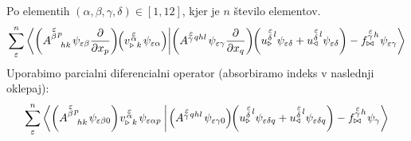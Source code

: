 Po elementih $(\alpha, \beta, \gamma, \delta) \in [1,12]$, kjer je $n$ število elementov.
\begin{equation}
   \sum^n_{\varepsilon}
   \braket{
      \left(A^{\substack{\mkern2mu \varepsilon \\[0.15mm] \beta} \mkern2mu p}_{\mkern19mu hk} \mkern2mu \psi_{ \varepsilon \beta} \frac{\partial}{\partial x_p}\right) \mkern-5mu
      \left(v^{\mkern 2mu \substack{\varepsilon \\[-0.5mm] \alpha \\[-0.2mm]}}_{\triangleright \mkern5mu k} \mkern2mu \psi_{\varepsilon \alpha}\right)}
   {
      \left(A^{\substack{\mkern2mu \varepsilon \\[-0.4mm] \gamma} \mkern2mu qhl} \mkern2mu \psi_{\varepsilon \gamma} \frac{\partial}{\partial x_q}\right) \mkern-5mu
      \left(u^{\substack{\mkern2mu \varepsilon \\[0.2mm] \delta} \mkern2mu l}_\triangleright \psi_{\varepsilon \delta} + u^{\substack{\mkern2mu \varepsilon \\[0.2mm] \delta} \mkern2mu l}_\triangleleft \psi_{\varepsilon \delta} \right)
      -
      f^{\substack{\mkern2mu \varepsilon \\[-0.4mm] \gamma} \mkern2mu h}_{\bowtie} \mkern1mu \psi_{\varepsilon \gamma}}
\end{equation}
Uporabimo parcialni diferencialni operator (absorbiramo indeks v naslednji oklepaj):
\begin{equation*}
   \sum^n_\varepsilon
   \braket{
      \left( A^{\substack{\mkern2mu \varepsilon \\[0.15mm] \beta} \mkern2mu p}_{\mkern19mu hk} \mkern2mu \psi_{ \varepsilon \beta 0} \right) \mkern-2mu
      v^{\mkern 2mu \substack{\varepsilon \\[-0.5mm] \alpha \\[-0.2mm]}}_{\triangleright \mkern5mu k} \mkern2mu \psi_{\varepsilon \alpha p} \mkern4mu}
   {
      \mkern2mu \left( A^{\substack{\mkern2mu \varepsilon \\[-0.4mm] \gamma} \mkern2mu qhl} \mkern2mu \psi_{\varepsilon \gamma 0} \right) \mkern-5mu 
      \left( u^{\substack{\mkern2mu \varepsilon \\[0.2mm] \delta} \mkern2mu l}_\triangleright \psi_{\varepsilon \delta q} + u^{\substack{\mkern2mu \varepsilon \\[0.2mm] \delta} \mkern2mu l}_\triangleleft \psi_{\varepsilon \delta q} \right)
      -
      f^{\substack{\mkern2mu \varepsilon \\[-0.4mm] \gamma} \mkern2mu h}_{\bowtie} \mkern1mu \psi_\gamma }
\end{equation*}
